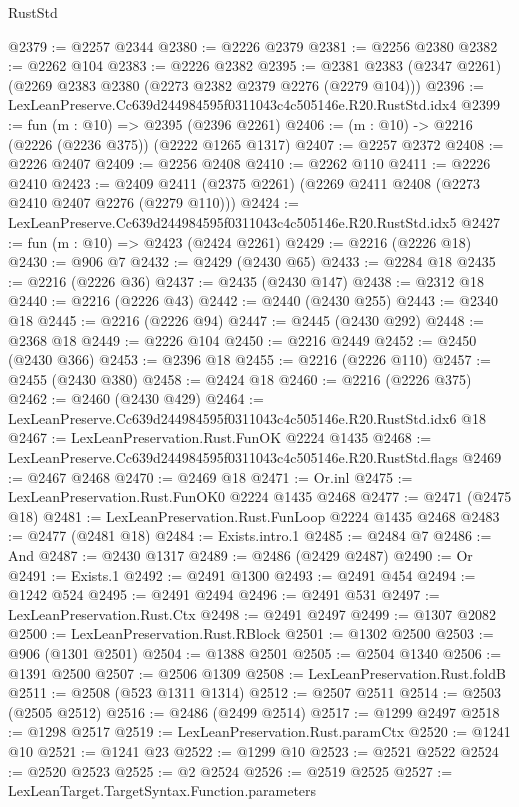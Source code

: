 \begin{lexlean}{RustStd}
\begin{coremodule}
@2379 := @2257 @2344
@2380 := @2226 @2379
@2381 := @2256 @2380
@2382 := @2262 @104
@2383 := @2226 @2382
@2395 := @2381 @2383 (@2347 @2261) (@2269 @2383 @2380 (@2273 @2382 @2379 @2276 (@2279 @104)))
@2396 := LexLeanPreserve.Cc639d244984595f0311043c4c505146e.R20.RustStd.idx4
@2399 := fun (m : @10) => @2395 (@2396 @2261)
@2406 := (m : @10) -> @2216 (@2226 (@2236 @375)) (@2222 @1265 @1317)
@2407 := @2257 @2372
@2408 := @2226 @2407
@2409 := @2256 @2408
@2410 := @2262 @110
@2411 := @2226 @2410
@2423 := @2409 @2411 (@2375 @2261) (@2269 @2411 @2408 (@2273 @2410 @2407 @2276 (@2279 @110)))
@2424 := LexLeanPreserve.Cc639d244984595f0311043c4c505146e.R20.RustStd.idx5
@2427 := fun (m : @10) => @2423 (@2424 @2261)
@2429 := @2216 (@2226 @18)
@2430 := @906 @7
@2432 := @2429 (@2430 @65)
@2433 := @2284 @18
@2435 := @2216 (@2226 @36)
@2437 := @2435 (@2430 @147)
@2438 := @2312 @18
@2440 := @2216 (@2226 @43)
@2442 := @2440 (@2430 @255)
@2443 := @2340 @18
@2445 := @2216 (@2226 @94)
@2447 := @2445 (@2430 @292)
@2448 := @2368 @18
@2449 := @2226 @104
@2450 := @2216 @2449
@2452 := @2450 (@2430 @366)
@2453 := @2396 @18
@2455 := @2216 (@2226 @110)
@2457 := @2455 (@2430 @380)
@2458 := @2424 @18
@2460 := @2216 (@2226 @375)
@2462 := @2460 (@2430 @429)
@2464 := LexLeanPreserve.Cc639d244984595f0311043c4c505146e.R20.RustStd.idx6 @18
@2467 := LexLeanPreservation.Rust.FunOK @2224 @1435
@2468 := LexLeanPreserve.Cc639d244984595f0311043c4c505146e.R20.RustStd.flags
@2469 := @2467 @2468
@2470 := @2469 @18
@2471 := Or.inl
@2475 := LexLeanPreservation.Rust.FunOK0 @2224 @1435 @2468
@2477 := @2471 (@2475 @18)
@2481 := LexLeanPreservation.Rust.FunLoop @2224 @1435 @2468
@2483 := @2477 (@2481 @18)
@2484 := Exists.intro.{1}
@2485 := @2484 @7
@2486 := And
@2487 := @2430 @1317
@2489 := @2486 (@2429 @2487)
@2490 := Or
@2491 := Exists.{1}
@2492 := @2491 @1300
@2493 := @2491 @454
@2494 := @1242 @524
@2495 := @2491 @2494
@2496 := @2491 @531
@2497 := LexLeanPreservation.Rust.Ctx
@2498 := @2491 @2497
@2499 := @1307 @2082
@2500 := LexLeanPreservation.Rust.RBlock
@2501 := @1302 @2500
@2503 := @906 (@1301 @2501)
@2504 := @1388 @2501
@2505 := @2504 @1340
@2506 := @1391 @2500
@2507 := @2506 @1309
@2508 := LexLeanPreservation.Rust.foldB
@2511 := @2508 (@523 @1311 @1314)
@2512 := @2507 @2511
@2514 := @2503 (@2505 @2512)
@2516 := @2486 (@2499 @2514)
@2517 := @1299 @2497
@2518 := @1298 @2517
@2519 := LexLeanPreservation.Rust.paramCtx
@2520 := @1241 @10
@2521 := @1241 @23
@2522 := @1299 @10
@2523 := @2521 @2522
@2524 := @2520 @2523
@2525 := @2 @2524
@2526 := @2519 @2525
@2527 := LexLeanTarget.TargetSyntax.Function.parameters

\end{coremodule}
\end{lexlean}
